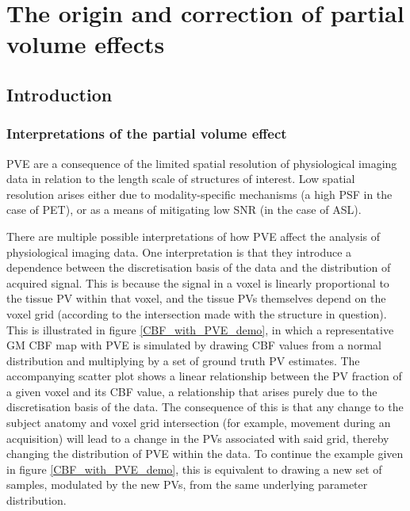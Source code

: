  

\chapter{The origin and correction of partial volume effects}
\label{pvec_chapter}

\section{Introduction}
\subsection{Interpretations of the partial volume effect}

PVE are a consequence of the limited spatial resolution of physiological imaging data in relation to the length scale of structures of interest. Low spatial resolution arises either due to modality-specific mechanisms (a high PSF in the case of PET), or as a means of mitigating low SNR (in the case of ASL). 

There are multiple possible interpretations of how PVE affect the analysis of physiological imaging data. One interpretation is that they introduce a dependence between the discretisation basis of the data and the distribution of acquired signal. This is because the signal in a voxel is linearly proportional to the tissue PV within that voxel, and the tissue PVs themselves depend on the voxel grid (according to the intersection made with the structure in question). This is illustrated in figure \ref{CBF_with_PVE_demo}, in which a representative GM CBF map with PVE is simulated by drawing CBF values from a normal distribution and multiplying by a set of ground truth PV estimates. The accompanying scatter plot shows a linear relationship between the PV fraction of a given voxel and its CBF value, a relationship that arises purely due to the discretisation basis of the data. The consequence of this is that any change to the subject anatomy and voxel grid intersection (for example, movement during an acquisition) will lead to a change in the PVs associated with said grid, thereby changing the distribution of PVE within the data. To continue the example given in figure \ref{CBF_with_PVE_demo}, this is equivalent to drawing a new set of samples, modulated by the new PVs, from the same underlying parameter distribution.

